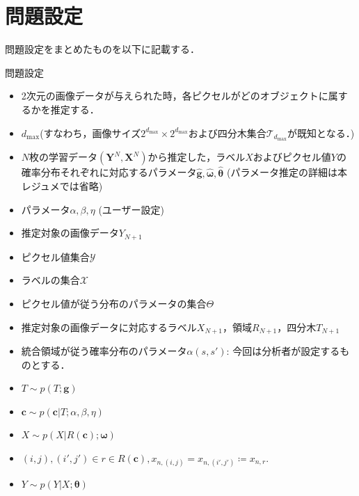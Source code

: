 \documentclass{jsarticle}
\theoremstyle{definition}
\begin{document}
\section{問題設定}
問題設定をまとめたものを以下に記載する．


\begin{itembox}[l]{問題設定}%
    \begin{itemize}
      \item 2次元の画像データが与えられた時，各ピクセルがどのオブジェクトに属するかを推定する．
    \end{itemize}
  
    \begin{itemize}
      \item $d_{\mathrm{max}}$\quad(すなわち，画像サイズ$2^{d_{\mathrm{max}}}\times2^{d_{\mathrm{max}}}$および四分木集合$\mathcal{T}_{d_{\mathrm{max}}}$が既知となる．)
      \item $N$枚の学習データ$(\bm{Y}^N, \bm{X}^N)$から推定した，ラベル$X$およびピクセル値$Y$の確率分布それぞれに対応するパラメータ$\hat{\bm{g}}, \hat{\bm{\omega}},\hat{\bm{\theta}}$ (パラメータ推定の詳細は本レジュメでは省略)
      \item パラメータ$\alpha, \beta, \eta$ (ユーザー設定)
      \item 推定対象の画像データ$Y_{N+1}$
      \item ピクセル値集合$\mathcal{Y}$
      \item ラベルの集合$\mathcal{X}$
      \item ピクセル値が従う分布のパラメータの集合$\Theta$
    \end{itemize}
    
    \begin{itemize}
      \item 推定対象の画像データに対応するラベル$X_{N+1}$，領域$R_{N+1}$，四分木$T_{N+1}$
      \item 統合領域が従う確率分布のパラメータ$\alpha(s, s')$: 今回は分析者が設定するものとする．
    \end{itemize}

    \begin{itemize}
      \item $T\sim p(T;\bm{g})$
      \item $\bm{c} \sim p(\bm{c}|T;\alpha, \beta, \eta)$
      \item $X \sim p(X|R(\bm{c});\bm{\omega})$
      \item $(i,j),(i',j')\in r\in R(\bm{c}), x_{n,(i,j)}=x_{n,(i',j')}\coloneqq x_{n,r}.$
      \item $Y \sim p(Y|X; \bm{\theta})$
    \end{itemize}
    

\end{itembox}
\end{document}
